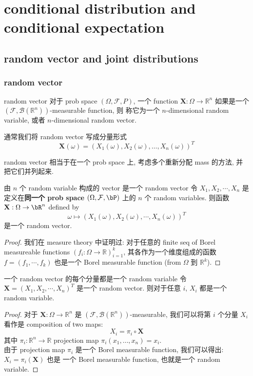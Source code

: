 \chapter{conditional distribution and conditional expectation}
\section{random vector and joint distributions}
\subsection{random vector}
\begin{definition}{random vector}
对于 prob space $(\Omega, \mathcal{F}, P)$, 
一个 function $\mathbf{X}: \Omega \to \mathbb{R}^n$ 如果是一个
$(\mathcal{F}, \mathcal{B}(\mathbb{R}^n))$-measurable function, 则
称它为一个 $n$-dimensional random variable, 或者 $n$-dimensional random vector.

通常我们将 random vector 写成分量形式
$$\mathbf{X}(\omega) = (X_1(\omega), X_2(\omega), \dots, X_n(\omega))^T$$
\end{definition}
random vector 相当于在一个 prob space 上, 考虑多个重新分配 mass 的方法, 并把它们并列起来.
\begin{proposition}{由 \(n\) 个 random variable 构成的 vector 是一个 random vector}
    令 \(X_1, X_2, \cdots, X_n\) 
    是定义在\textbf{同一个 prob space} \((\Omega, \mathcal{F}, \bP)\) 
    上的 \(n\) 个 random variables. 则函数 \(\mathbf{X}: \Omega \to \bR^n\) defined by 
    \[
    \omega \mapsto (X_1(\omega), X_2(\omega), \cdots, X_n(\omega))^T
    \]
    是一个 random vector.
\end{proposition}
\begin{proof}
    我们在 measure theory 中证明过: 对于任意的 finite seq of Borel measureable functions 
    \( (  {f_i}: \Omega \to \mathbb{R} )_{i=1}^k\), 其各作为一个维度组成的函数
    \(f = (f_1,\cdots, f_k)\) 也是一个 Borel measurable function (from \(\Omega\) 到 \(\mathbb{R}^k\)).
\end{proof}
\begin{proposition}{一个 random vector 的每个分量都是一个 random variable}
    令 \(\mathbf{X} = (X_1, X_2, \cdots, X_n)^T\) 是一个 random vector. 
    则对于任意 \(i\), \(X_i\) 都是一个 random variable.
\end{proposition}
\begin{proof}
    对于 $\mathbf{X}: \Omega \to \mathbb{R}^n$ 是 $(\mathcal{F}, \mathcal{B}(\mathbb{R}^n))$-measurable,
    我们可以将第 $i$ 个分量 $X_i$ 看作是 composition of two maps: 
    $$X_i = \pi_i \circ \mathbf{X}$$
    其中 $\pi_i: \mathbb{R}^n \to \mathbb{R}$ projection map  $\pi_i(x_1, \dots, x_n) = x_i$.\\
    由于 projection map $\pi_i$ 是一个 Borel measurable function, 我们可以得出: \(X_i = \pi_i(\mathbf{X})\) 也是
一个 Borel measurable function, 也就是一个 random variable.
\end{proof}

